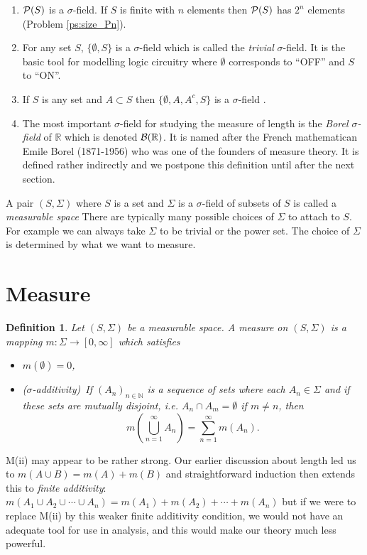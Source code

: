 \documentclass[a4paper]{report}
\newcounter{thm_counter}[chapter]
\newtheorem{defn}[thm_counter]{Definition}
\numberwithin{equation}{chapter}
\numberwithin{thm_counter}{section}
\def\mb{\mathbb} %
\def\R{\mb{R}} %
\def\N{\mb{N}}
\begin{document}
\begin{enumerate}
\item  ${\cal P}(S)$ is a $\sigma$-field. If $S$ is
finite with $n$ elements then ${\cal P}(S)$ has $2^{n}$ elements (Problem \ref{ps:size_Pn}).

\item For any set $S$, $\{\emptyset, S\}$ is a $\sigma$-field which is called the {\it trivial} $\sigma$-field. It is the basic tool for modelling logic circuitry where $\emptyset$ corresponds to ``OFF'' and $S$ to ``ON''.

\item If $S$ is any set and $A \subset S$ then $\{\emptyset, A, A^{c},S\}$ is a $\sigma$-field .

\item The most important $\sigma$-field for studying the measure of length is the {\it Borel $\sigma$-field} of $\R$ which is denoted ${\cal B}(\R)$. It is named after the French mathematican Emile Borel (1871-1956) who was one of the founders of measure theory. It is defined rather indirectly and we postpone this definition until after the next section.

\end{enumerate}

A pair $(S, \Sigma)$ where $S$ is a set and $\Sigma$ is a $\sigma$-field of subsets of $S$ is called a {\it measurable space}
There are typically many possible choices of $\Sigma$ to attach to $S$. For example we can  always take $\Sigma$ to be trivial or the power set. The choice of $\Sigma$ is determined by what we want to measure. 


\newpage
\section{Measure}

\begin{defn}
\label{def:measure}
Let $(S, \Sigma)$ be a measurable space. A measure on $(S, \Sigma)$ is a mapping $m: \Sigma \rightarrow [0, \infty]$ which satisfies
\begin{itemize}
\item[M(i)] $m(\emptyset) = 0$,

\item[M(ii)] ({\it $\sigma$-additivity})~If $(A_{n})_{n\in\N}$ is a
sequence of sets where each $A_{n} \in \Sigma$ and if these sets
are mutually disjoint, i.e. $A_{n} \cap A_{m} = \emptyset$ if $m
\neq n$, then
$$m\left(\bigcup_{n=1}^{\infty}A_{n}\right) =
\sum_{n=1}^{\infty}m(A_{n}).$$
\end{itemize}
\end{defn}
M(ii) may appear to be rather strong. Our earlier discussion about length led us to $m(A \cup B) = m(A) + m(B)$ and straightforward induction then extends this to {\it finite additivity}: $m(A_{1} \cup A_{2} \cup \cdots \cup A_{n}) = m(A_{1}) + m(A_{2}) + \cdots + m(A_{n})$ but if we were to replace M(ii) by this weaker finite additivity condition, we would not have an adequate tool for use in analysis, and this would make our theory much less powerful.
\end{document}
